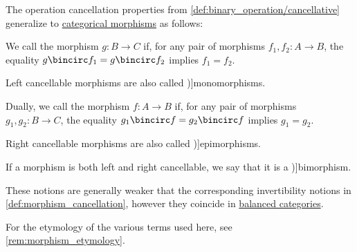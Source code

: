 \begin{definition}\label{def:morphism_cancellation}
  The operation cancellation properties from \cref{def:binary_operation/cancellative} generalize to \hyperref[def:category/morphisms]{categorical morphisms} as follows:
  \begin{thmenum}
     We call the morphism \( g: B \to C \)  if, for any pair of morphisms \( f_1, f_2: A \to B \), the equality \( g \bincirc f_1 = g \bincirc f_2 \) implies \( f_1 = f_2 \).

    Left cancellable morphisms are also called \term[ru=мономорфизм (\cite[26]{ЦаленкоШульгейфер1974ОсновыТеорииКатегорий})]{monomorphisms}.

     Dually, we call the morphism \( f: A \to B \)  if, for any pair of morphisms \( g_1, g_2: B \to C \), the equality \( g_1 \bincirc f = g_2 \bincirc f \) implies \( g_1 = g_2 \).

    Right cancellable morphisms are also called \term[ru=эпиморфизм (\cite[29]{ЦаленкоШульгейфер1974ОсновыТеорииКатегорий})]{epimorphisms}.

     If a morphism is both left and right cancellable, we say that it is a \term[ru=биморфизм (\cite[29]{ЦаленкоШульгейфер1974ОсновыТеорииКатегорий})]{bimorphism}.
  \end{thmenum}
\end{definition}
\begin{comments}
  \item These notions are generally weaker that the corresponding invertibility notions in \cref{def:morphism_cancellation}, however they coincide in \hyperref[def:balanced_category]{balanced categories}.

  \item For the etymology of the various terms used here, see \cref{rem:morphism_etymology}.
\end{comments}

